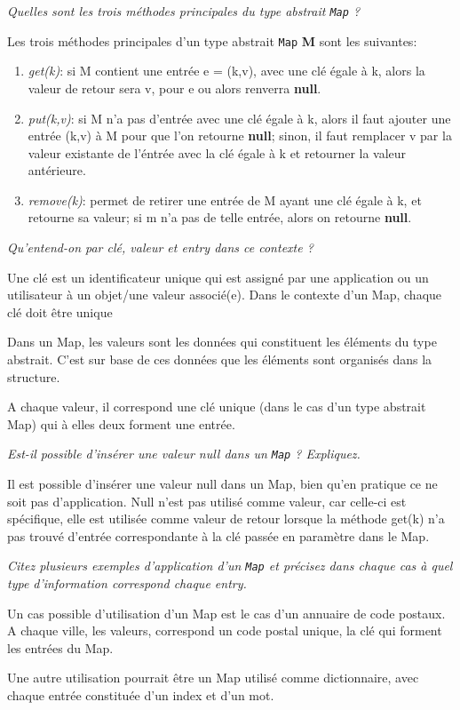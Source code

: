 \textit{Quelles sont les trois méthodes principales du type abstrait \texttt{Map} ?}

Les trois méthodes principales d'un type abstrait \texttt{Map} \textbf{M} sont les suivantes:
\begin{enumerate}
\item \textit{get(k)}: si M contient une entrée e = (k,v), avec une clé égale à k, alors la valeur de retour sera v, pour e 
ou alors renverra \textbf{null}.
\item \textit{put(k,v)}: si M n'a pas d'entrée avec une clé égale à k, alors il faut ajouter une entrée (k,v) à M pour 
que l'on retourne \textbf{null}; sinon, il faut remplacer v par la valeur existante de l'éntrée avec la clé égale à k et retourner 
la valeur antérieure.
\item \textit{remove(k)}: permet de retirer une entrée de M ayant une clé égale à k, et retourne sa valeur; si m n'a pas de telle entrée, alors on retourne \textbf{null}.
\end{enumerate}

\textit{Qu’entend-on par clé, valeur et entry dans ce contexte ?}

Une clé est un identificateur unique qui est assigné par une application ou un utilisateur à un objet/une valeur associé(e). Dans le contexte d'un Map, chaque clé doit être unique

Dans un Map, les valeurs sont les données qui constituent les éléments du type abstrait. C'est sur base de ces données que les éléments sont organisés dans la structure.

A chaque valeur, il correspond une clé unique (dans le cas d'un type abstrait Map) qui à elles deux forment une entrée.

\textit{Est-il possible d’insérer une valeur null dans un \texttt{Map} ? Expliquez.}

Il est possible d'insérer une valeur null dans un Map, bien qu'en pratique ce ne soit pas d'application. Null n'est pas utilisé comme valeur, car celle-ci est spécifique, elle est utilisée comme valeur de retour lorsque la méthode get(k) n'a pas trouvé d'entrée correspondante à la clé passée en paramètre dans le Map.

\textit{Citez plusieurs exemples d’application d’un \texttt{Map} et précisez dans chaque cas à quel type d’information correspond chaque entry.}

Un cas possible d'utilisation d'un Map est le cas d'un annuaire de code postaux. A chaque ville, les valeurs, correspond un code postal unique, la clé qui forment les entrées du Map.

Une autre utilisation pourrait être un Map utilisé comme dictionnaire, avec chaque entrée constituée d'un index et d'un mot.


